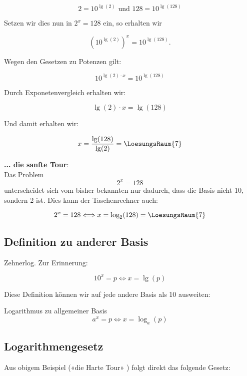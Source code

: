 $$2= 10^{\lg(2)} \textrm{ und } 128 = 10^{\lg(128)}$$

Setzen wir dies nun in $2^x=128$ ein, so erhalten wir

$$\left(10^{\lg(2)}\right)^x = 10^{\lg(128)}.$$


Wegen den Gesetzen zu Potenzen gilt:

$$10^{\lg(2)\cdot{}x} = 10^{\lg(128)}$$

  Durch Exponetenvergleich erhalten wir:

  $$\lg(2)\cdot{}x = \lg(128)$$

  Und damit erhalten wir:

  $$x = \frac{\lg(128)}{\lg(2)} = \LoesungsRaum{7}$$


  \textbf{... die sanfte Tour}:\\

 Das Problem $$2^x=128$$ unterscheidet sich vom bisher bekannten nur
 dadurch, dass die Basis nicht 10, sondern 2 ist. Dies kann der
 Taschenrechner auch: 

 $$2^x = 128 \Longleftrightarrow  x = \log_2(128) = \LoesungsRaum{7}$$
\newpage


\subsection{Definition zu anderer Basis}
 
\begin{bemerkung}{Zehnerlog.}{}
  Zur Erinnerung:

  $$10^x = p \Longleftrightarrow x = \lg(p)$$
\end{bemerkung}

Diese Definition können wir auf jede andere Basis als 10 ausweiten:

 \begin{definition}{Logarithmus zu allgemeiner Basis}{}
   $$a^x=p \Longleftrightarrow x = \log_a(p)$$
   \end{definition}

\newpage


 \subsection{Logarithmengesetz}
Aus obigem Beispiel («die Harte Tour» ) folgt direkt das folgende Gesetz:

